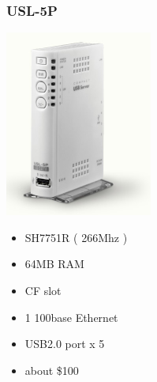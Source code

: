 \documentclass[cjk,dvipdfmx,12pt]{beamer}
\begin{document}
\begin{frame}
 \frametitle{USL-5P}
 \begin{minipage}[t]{0.4\hsize}
  \includegraphics[width=0.8\hsize]{image200705/usl5p.png}
 \end{minipage} 
 \begin{minipage}[t]{0.5\hsize}
  \begin{itemize}
   \item SH7751R ( 266Mhz )
   \item 64MB RAM 
   \item CF slot 
   \item 1 100base Ethernet
   \item USB2.0 port x 5
   \item about \$100
  \end{itemize}
 \end{minipage}
\end{frame}
\end{document}
